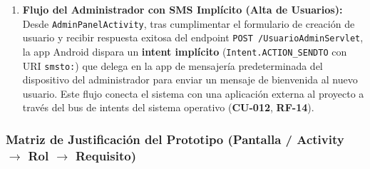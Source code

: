 \documentclass{report}
\begin{document}
\begin{enumerate}
    \item \textbf{Flujo del Administrador con SMS Implícito (Alta de Usuarios):}
    Desde \texttt{AdminPanelActivity}, tras cumplimentar el formulario de creación de usuario y recibir respuesta exitosa del endpoint \texttt{POST /UsuarioAdminServlet}, la app Android dispara un \textbf{intent implícito} (\texttt{Intent.ACTION\_SENDTO} con URI \texttt{smsto:}) que delega en la app de mensajería predeterminada del dispositivo del administrador para enviar un mensaje de bienvenida al nuevo usuario. Este flujo conecta el sistema con una aplicación externa al proyecto a través del bus de intents del sistema operativo (\textbf{CU-012}, \textbf{RF-14}).
\end{enumerate}

\subsubsection*{Matriz de Justificación del Prototipo (Pantalla / Activity $\rightarrow$ Rol $\rightarrow$ Requisito)}
\end{document}
